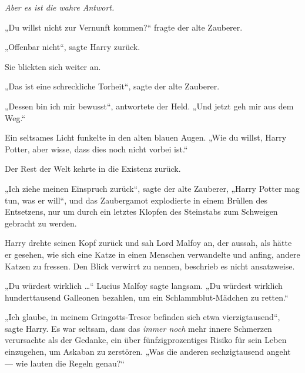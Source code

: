 \emph{Aber es ist die wahre Antwort.}

„Du willst nicht zur Vernunft kommen?“ fragte der alte Zauberer.

„Offenbar nicht“, sagte Harry zurück.

Sie blickten sich weiter an.

„Das ist eine schreckliche Torheit“, sagte der alte Zauberer.

„Dessen bin ich mir bewusst“, antwortete der Held.
„Und jetzt geh mir aus dem Weg.“

Ein seltsames Licht funkelte in den alten blauen Augen.
„Wie du willst, Harry Potter, aber wisse, dass dies noch nicht vorbei ist.“

Der Rest der Welt kehrte in die Existenz zurück.

„Ich ziehe meinen Einspruch zurück“, sagte der alte Zauberer,
„Harry Potter mag tun, was er will“, und das Zaubergamot explodierte in einem Brüllen des Entsetzens, nur um durch ein letztes Klopfen des Steinstabs zum Schweigen gebracht zu werden.

Harry drehte seinen Kopf zurück und sah Lord Malfoy an, der aussah, als hätte er gesehen, wie sich eine Katze in einen Menschen verwandelte und anfing, andere Katzen zu fressen. Den Blick verwirrt zu nennen, beschrieb es nicht ansatzweise.

„Du würdest wirklich …“ Lucius Malfoy sagte langsam.
„Du würdest wirklich hunderttausend Galleonen bezahlen, um ein Schlammblut-Mädchen zu retten.“

„Ich glaube, in meinem Gringotts-Tresor befinden sich etwa vierzigtausend“, sagte Harry. Es war seltsam, dass das \emph{immer noch} mehr innere Schmerzen verursachte als der Gedanke, ein über fünfzigprozentiges Risiko für sein Leben einzugehen, um Askaban zu zerstören.
„Was die anderen sechzigtausend angeht — wie lauten die Regeln genau?“

